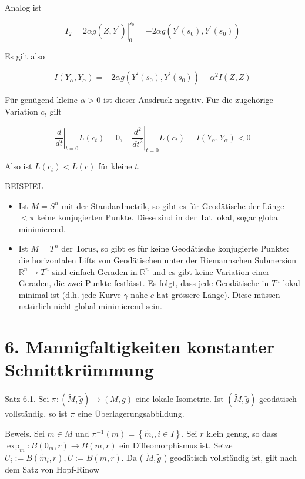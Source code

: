 \documentclass[10pt, letterpaper]{article}
\begin{document}
Analog ist

$$
I_{2}=\left.2 \alpha g\left(Z, Y^{\prime}\right)\right|_{0} ^{s_{0}}=-2 \alpha g\left(Y^{\prime}\left(s_{0}\right), Y^{\prime}\left(s_{0}\right)\right)
$$

Es gilt also

$$
I\left(Y_{\alpha}, Y_{\alpha}\right)=-2 \alpha g\left(Y^{\prime}\left(s_{0}\right), Y^{\prime}\left(s_{0}\right)\right)+\alpha^{2} I(Z, Z)
$$

Für genügend kleine $\alpha>0$ ist dieser Ausdruck negativ. Für die zugehörige Variation $c_{t}$ gilt

$$
\left.\frac{d}{d t}\right|_{t=0} L\left(c_{t}\right)=0,\left.\quad \frac{d^{2}}{d t^{2}}\right|_{t=0} L\left(c_{t}\right)=I\left(Y_{\alpha}, Y_{\alpha}\right)<0
$$

Also ist $L\left(c_{t}\right)<L(c)$ für kleine $t$.

BEISPIEL

\begin{itemize}
  \item Ist $M=S^{n}$ mit der Standardmetrik, so gibt es für Geodätische der Länge $<\pi$ keine konjugierten Punkte. Diese sind in der Tat lokal, sogar global minimierend.
  \item Ist $M=T^{n}$ der Torus, so gibt es für keine Geodätische konjugierte Punkte: die horizontalen Lifts von Geodätischen unter der Riemannschen Submersion $\mathbb{R}^{n} \rightarrow T^{n}$ sind einfach Geraden in $\mathbb{R}^{n}$ und es gibt keine Variation einer Geraden, die zwei Punkte festlässt. Es folgt, dass jede Geodätische in $T^{n}$ lokal minimal ist (d.h. jede Kurve $\gamma$ nahe $c$ hat grössere Länge). Diese müssen natürlich nicht global minimierend sein.
\end{itemize}

\section*{6. Mannigfaltigkeiten konstanter Schnittkrümmung}
Satz 6.1. Sei $\pi:(\tilde{M}, \tilde{g}) \rightarrow(M, g)$ eine lokale Isometrie. Ist $(\tilde{M}, \tilde{g})$ geodätisch vollständig, so ist $\pi$ eine Überlagerungsabbildung.

Beweis. Sei $m \in M$ und $\pi^{-1}(m)=\left\{\tilde{m}_{i}, i \in I\right\}$. Sei $r$ klein genug, so dass $\exp _{m}: B\left(0_{m}, r\right) \rightarrow B(m, r)$ ein Diffeomorphismus ist. Setze $U_{i}:=B\left(\tilde{m}_{i}, r\right), U:=B(m, r)$. Da ( $\tilde{M}, \tilde{g}$ ) geodätisch vollständig ist, gilt nach dem Satz von Hopf-Rinow
\end{document}
